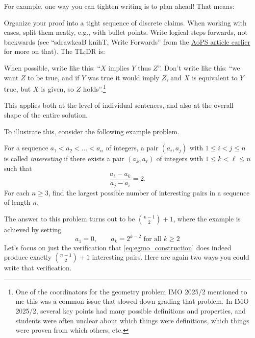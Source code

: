 \documentclass[11pt]{scrartcl}
\begin{document}
For example, one way you can tighten writing is to plan ahead! That means:
\begin{itemize}
  \ii Organize your proof into a tight sequence of discrete claims.
  \ii When working with cases, split them neatly, e.g., with bullet points.
  \ii Write logical steps forwards, not backwards
  (see ``sdrawkcaB knihT, Write Forwards'' from the
  \href{https://www.aops.com/articles/how-to-write-solution}{AoPS article earlier}
  for more on that).
  The TL;DR is:
  \begin{itemize}
    \ii When possible, write like this: ``$X$ implies $Y$ thus $Z$''.
    \ii Don't write like this: ``we want $Z$ to be true,
    and if $Y$ was true it would imply $Z$,
    and $X$ is equivalent to $Y$ true, but $X$ is given, so $Z$ holds''.\footnote{One
      of the coordinators for the geometry problem IMO 2025/2
      mentioned to me this was a common issue that slowed down grading that problem.
      In IMO 2025/2, several key points had many possible definitions and properties,
      and students were often unclear about which things were definitions,
      which things were proven from which others, etc.}
  \end{itemize}
  This applies both at the level of individual sentences,
  and also at the overall shape of the entire solution.
\end{itemize}
To illustrate this, consider the following example problem.
\begin{example}
  [EGMO 2024/4]
  For a sequence $a_1<a_2<\dots<a_n$ of integers,
  a pair $(a_i,a_j)$ with $1\leq i<j\leq n$ is called \emph{interesting}
  if there exists a pair $(a_k,a_\ell)$ of integers with $1\leq k<\ell\leq n$ such that
  \[ \frac{a_\ell-a_k}{a_j-a_i}=2. \]
  For each $n\geq 3$, find the largest possible number of interesting pairs
  in a sequence of length $n$.
\end{example}
The answer to this problem turns out to be $\binom{n-1}{2}+1$,
where the example is achieved by setting
\begin{equation}
  a_1 = 0, \qquad a_k = 2^{k-2} \text{ for all } k \ge 2
  \label{eq:egmo_construction}
\end{equation}
Let's focus on just the verification that \eqref{eq:egmo_construction}
does indeed produce exactly $\binom{n-1}{2}+1$ interesting pairs.
Here are again two ways you could write that verification.
\end{document}
